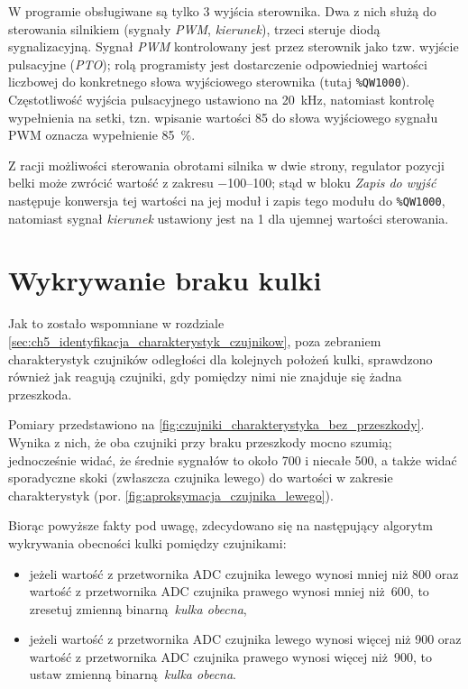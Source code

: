 W programie obsługiwane są tylko \num{3} wyjścia sterownika. Dwa z nich służą do sterowania silnikiem (sygnały \textit{PWM}, \textit{kierunek}), trzeci steruje diodą sygnalizacyjną. Sygnał \textit{PWM} kontrolowany jest przez sterownik jako tzw. wyjście pulsacyjne (\textit{PTO}); rolą programisty jest dostarczenie odpowiedniej wartości liczbowej do konkretnego słowa wyjściowego sterownika (tutaj \texttt{\%QW1000}). Częstotliwość wyjścia pulsacyjnego ustawiono na \SI{20}{\kilo\hertz}, natomiast kontrolę wypełnienia na setki, tzn. wpisanie wartości \num{85} do słowa wyjściowego sygnału PWM oznacza wypełnienie \SI{85}{\percent}.

Z racji możliwości sterowania obrotami silnika w dwie strony, regulator pozycji belki może zwrócić wartość z zakresu \numrange[range-phrase={ do }]{-100}{100}; stąd w bloku \textit{Zapis do wyjść} następuje konwersja tej wartości na jej moduł i zapis tego modułu do \texttt{\%QW1000}, natomiast sygnał \textit{kierunek} ustawiony jest na \num{1} dla ujemnej wartości sterowania.




\section{Wykrywanie braku kulki}
\label{sec:ch7_wykrywanie_braku_kulki}

Jak to zostało wspomniane w rozdziale \ref{sec:ch5_identyfikacja_charakterystyk_czujnikow}, poza zebraniem charakterystyk czujników odległości dla kolejnych położeń kulki, sprawdzono również jak reagują czujniki, gdy pomiędzy nimi nie znajduje się żadna przeszkoda.

Pomiary przedstawiono na \cref{fig:czujniki_charakterystyka_bez_przeszkody}. Wynika z nich, że oba czujniki przy braku przeszkody mocno szumią; jednocześnie widać, że średnie sygnałów to około \num{700} i niecałe \num{500}, a także widać sporadyczne skoki (zwłaszcza czujnika lewego) do wartości w zakresie charakterystyk (por. \cref{fig:aproksymacja_czujnika_lewego}).

Biorąc powyższe fakty pod uwagę, zdecydowano się na następujący algorytm wykrywania obecności kulki pomiędzy czujnikami:
\begin{itemize}
    \item jeżeli wartość z przetwornika ADC czujnika lewego wynosi mniej niż \num{800} oraz wartość z przetwornika ADC czujnika prawego wynosi mniej niż \num{600}, to zresetuj zmienną binarną \textit{kulka obecna},
    \item jeżeli wartość z przetwornika ADC czujnika lewego wynosi więcej niż \num{900} oraz wartość z przetwornika ADC czujnika prawego wynosi więcej niż \num{900}, to ustaw zmienną binarną \textit{kulka obecna}.
\end{itemize}

